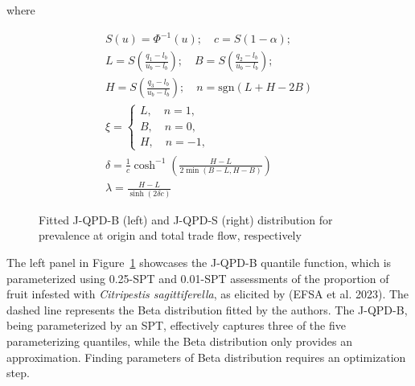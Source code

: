 \documentclass[
]{interact}
\begin{document}
where

\[
\begin{gathered}
S(u)=\Phi^{-1}(u); \quad c=S(1-\alpha);\\
L=S\left(\frac{q_1-l_b}{u_b-l_b}\right); \quad  B=S\left(\frac{q_2-l_b}{u_b-l_b}\right);\\
H=S\left(\frac{q_3-l_b}{u_b-l_b}\right); \quad n=\text{sgn}(L+H-2B)\\
\xi=\begin{cases}L, \quad n=1,\\
B, \quad n=0,\\
H, \quad n=-1,\end{cases}\\
\delta=\frac{1}{c}\cosh^{-1}\left(\frac{H-L}{2\min(B-L,H-B)}\right)\\
\lambda=\frac{H-L}{\sinh(2\delta c)}
\end{gathered}
\]

\begin{figure}


\caption{\label{fig-jqpd1}Fitted J-QPD-B (left) and J-QPD-S (right)
distribution for prevalence at origin and total trade flow,
respectively}

\end{figure}%

The left panel in Figure~\ref{fig-jqpd1} showcases the J-QPD-B quantile
function, which is parameterized using 0.25-SPT and 0.01-SPT assessments
of the proportion of fruit infested with \emph{Citripestis
sagittiferella}, as elicited by (EFSA et al. 2023). The dashed line
represents the Beta distribution fitted by the authors. The J-QPD-B,
being parameterized by an SPT, effectively captures three of the five
parameterizing quantiles, while the Beta distribution only provides an
approximation. Finding parameters of Beta distribution requires an
optimization step.
\end{document}
